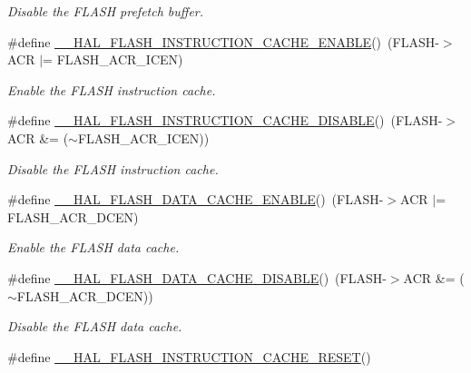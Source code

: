 \begin{DoxyCompactItemize}
\begin{DoxyCompactList}\small\item\em Disable the F\+L\+A\+SH prefetch buffer. \end{DoxyCompactList}\item 
\#define \hyperlink{group___f_l_a_s_h___exported___macros_gaddb00cd85fe48a524fad33c7fe63e038}{\+\_\+\+\_\+\+H\+A\+L\+\_\+\+F\+L\+A\+S\+H\+\_\+\+I\+N\+S\+T\+R\+U\+C\+T\+I\+O\+N\+\_\+\+C\+A\+C\+H\+E\+\_\+\+E\+N\+A\+B\+LE}()~(F\+L\+A\+SH-\/$>$A\+CR $\vert$= F\+L\+A\+S\+H\+\_\+\+A\+C\+R\+\_\+\+I\+C\+EN)
\begin{DoxyCompactList}\small\item\em Enable the F\+L\+A\+SH instruction cache. \end{DoxyCompactList}\item 
\#define \hyperlink{group___f_l_a_s_h___exported___macros_ga01bf00ed6e7c0e74ed0931f3b8b033ed}{\+\_\+\+\_\+\+H\+A\+L\+\_\+\+F\+L\+A\+S\+H\+\_\+\+I\+N\+S\+T\+R\+U\+C\+T\+I\+O\+N\+\_\+\+C\+A\+C\+H\+E\+\_\+\+D\+I\+S\+A\+B\+LE}()~(F\+L\+A\+SH-\/$>$A\+CR \&= ($\sim$F\+L\+A\+S\+H\+\_\+\+A\+C\+R\+\_\+\+I\+C\+EN))
\begin{DoxyCompactList}\small\item\em Disable the F\+L\+A\+SH instruction cache. \end{DoxyCompactList}\item 
\#define \hyperlink{group___f_l_a_s_h___exported___macros_gad94db5b43a234c8dd3dde8fcf0e4cedd}{\+\_\+\+\_\+\+H\+A\+L\+\_\+\+F\+L\+A\+S\+H\+\_\+\+D\+A\+T\+A\+\_\+\+C\+A\+C\+H\+E\+\_\+\+E\+N\+A\+B\+LE}()~(F\+L\+A\+SH-\/$>$A\+CR $\vert$= F\+L\+A\+S\+H\+\_\+\+A\+C\+R\+\_\+\+D\+C\+EN)
\begin{DoxyCompactList}\small\item\em Enable the F\+L\+A\+SH data cache. \end{DoxyCompactList}\item 
\#define \hyperlink{group___f_l_a_s_h___exported___macros_ga247f85a1fcc780be21f9fc2f1d29ee7e}{\+\_\+\+\_\+\+H\+A\+L\+\_\+\+F\+L\+A\+S\+H\+\_\+\+D\+A\+T\+A\+\_\+\+C\+A\+C\+H\+E\+\_\+\+D\+I\+S\+A\+B\+LE}()~(F\+L\+A\+SH-\/$>$A\+CR \&= ($\sim$F\+L\+A\+S\+H\+\_\+\+A\+C\+R\+\_\+\+D\+C\+EN))
\begin{DoxyCompactList}\small\item\em Disable the F\+L\+A\+SH data cache. \end{DoxyCompactList}\item 
\#define \hyperlink{group___f_l_a_s_h___exported___macros_ga69dff538775ee23738d54eef4a259b66}{\+\_\+\+\_\+\+H\+A\+L\+\_\+\+F\+L\+A\+S\+H\+\_\+\+I\+N\+S\+T\+R\+U\+C\+T\+I\+O\+N\+\_\+\+C\+A\+C\+H\+E\+\_\+\+R\+E\+S\+ET}()

\end{DoxyCompactItemize}
